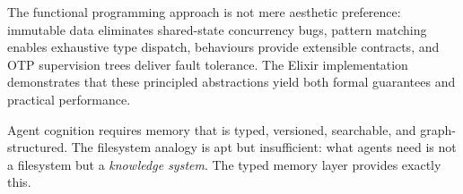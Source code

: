 \documentclass[12pt,a4paper]{article}
\theoremstyle{definition}
\begin{document}
The functional programming approach is not mere aesthetic preference: immutable data eliminates shared-state concurrency bugs, pattern matching enables exhaustive type dispatch, behaviours provide extensible contracts, and OTP supervision trees deliver fault tolerance.
The Elixir implementation demonstrates that these principled abstractions yield both formal guarantees and practical performance.

Agent cognition requires memory that is typed, versioned, searchable, and graph-structured.
The filesystem analogy is apt but insufficient: what agents need is not a filesystem but a \emph{knowledge system}.
The typed memory layer provides exactly this.



\end{document}
